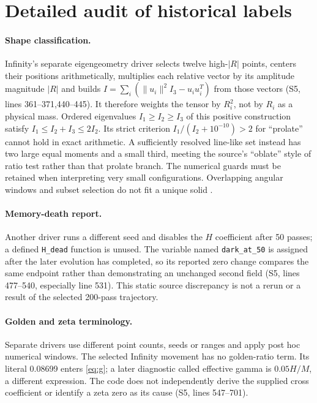 \documentclass[11pt,a4paper]{article}
\newcommand{\src}[2]{\textsf{#1}, lines #2}
\begin{document}
\section{Detailed audit of historical labels}
\label{app:audit}
\paragraph{Shape classification.} Infinity's separate eigengeometry driver selects twelve high-$|R|$ points, centers their positions arithmetically, multiplies each relative vector by its amplitude magnitude $|R|$ and builds $I=\sum_i(\|u_i\|^2I_3-u_iu_i^T)$ from those vectors (\src{S5}{361--371,440--445}). It therefore weights the tensor by $R_i^2$, not by $R_i$ as a physical mass. Ordered eigenvalues $I_1\geq I_2\geq I_3$ of this positive construction satisfy $I_1\leq I_2+I_3\leq2I_2$. Its strict criterion $I_1/(I_2+10^{-10})>2$ for ``prolate'' cannot hold in exact arithmetic. A sufficiently resolved line-like set instead has two large equal moments and a small third, meeting the source's ``oblate'' style of ratio test rather than that prolate branch. The numerical guards must be retained when interpreting very small configurations. Overlapping angular windows and subset selection do not fit a unique solid \cite{evidence5,review5}.

\paragraph{Memory-death report.} Another driver runs a different seed and disables the $H$ coefficient after 50 passes; a defined \texttt{H\_dead} function is unused. The variable named \texttt{dark\_at\_50} is assigned after the later evolution has completed, so its reported zero change compares the same endpoint rather than demonstrating an unchanged second field (\src{S5}{477--540}, especially line 531). This static source discrepancy is not a rerun or a result of the selected 200-pass trajectory.

\paragraph{Golden and zeta terminology.} Separate drivers use different point counts, seeds or ranges and apply post hoc numerical windows. The selected Infinity movement has no golden-ratio term. Its literal 0.08699 enters \eqref{eq:g}; a later diagnostic called effective gamma is $0.05H/M$, a different expression. The code does not independently derive the supplied cross coefficient or identify a zeta zero as its cause (\src{S5}{547--701}).
\end{document}
